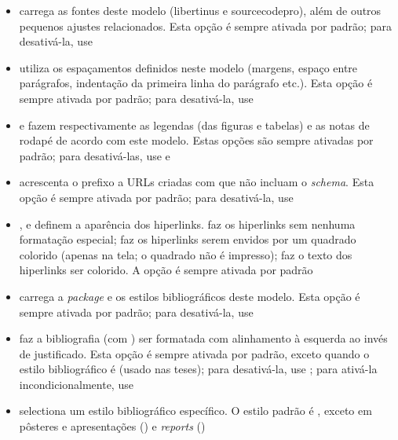 \begin{itemize}
  \item {} carrega as fontes deste modelo (libertinus e
        sourcecodepro), além de outros pequenos ajustes relacionados.
        Esta opção é sempre ativada por padrão; para desativá-la, use

  \item {} utiliza os espaçamentos definidos neste modelo (margens,
        espaço entre parágrafos, indentação da primeira linha do parágrafo
        etc.). Esta opção é sempre ativada por padrão; para desativá-la, use

  \item {} e  fazem respectivamente as legendas
        (das figuras e tabelas) e as notas de rodapé de acordo com este modelo.
        Estas opções são sempre ativadas por padrão; para desativá-las, use
         e 

  \item {} acrescenta o prefixo  a URLs criadas
        com  que não incluam o \textit{schema}. Esta opção é
        sempre ativada por padrão; para desativá-la, use 

  \item {},  e  definem a
        aparência dos hiperlinks.  faz os hiperlinks sem
        nenhuma formatação especial;  faz os hiperlinks
        serem envidos por um quadrado colorido (apenas na tela; o quadrado
        não é impresso);  faz o texto dos hiperlinks ser
        colorido. A opção  é sempre ativada por padrão

  \item {} carrega a \textit{package}  e os
        estilos bibliográficos deste modelo. Esta opção é sempre ativada
        por padrão; para desativá-la, use 
  \item {} faz a bibliografia (com ) ser
        formatada com alinhamento à esquerda ao invés de justificado.
        Esta opção é sempre ativada por padrão, exceto quando o estilo
        bibliográfico é  (usado nas teses); para
        desativá-la, use ; para ativá-la incondicionalmente,
        use 
  \item {} selectiona um estilo bibliográfico específico.
        O estilo padrão é , exceto em pôsteres e apresentações
        () e \textit{reports} ()


\end{itemize}
